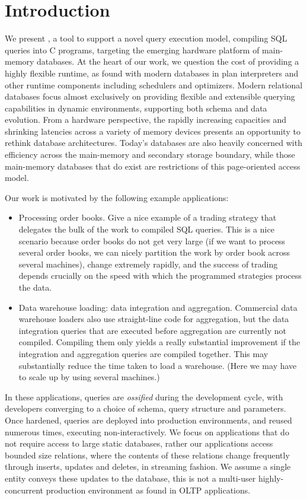\section{Introduction}
We present \compiler, a tool to support a novel query execution model, compiling
SQL queries into C programs, targeting the emerging hardware platform of main-memory
databases. At the heart of our work, we question the cost of providing a highly
flexible runtime, as found with modern databases in plan interpreters and other
runtime components including schedulers and optimizers. Modern relational
databases focus almost exclusively on providing flexible and extensible querying
capabilities in dynamic environments, supporting both schema and data evolution.
From a hardware perspective, the rapidly increasing capacities and shrinking
latencies across a variety of memory devices presents an opportunity to rethink
database architectures. Today's databases are also heavily concerned with
efficiency across the main-memory and secondary storage boundary, while those
main-memory databases that do exist are restrictions of this page-oriented access
model.

Our work is motivated by the following example applications:

\begin{itemize}
\item
Processing order books. Give a nice example of a trading strategy that
delegates the bulk of the work to compiled SQL queries.
This is a nice scenario because order books do not get very large (if we
want to process several order books, we can nicely partition the work by
order book across several machines), change extremely rapidly, and the
success of trading depends crucially on the speed with which the programmed
strategies process the data.

\item
Data warehouse loading: data integration and aggregation.
Commercial data warehouse loaders also use straight-line code for aggregation,
but the data integration queries that are executed before aggregation are
currently not compiled. Compiling them only yields a really substantial
improvement if the integration and aggregation queries are compiled together.
This may substantially reduce the time taken to load a warehouse. (Here we may
have to scale up by using several machines.)
\end{itemize}

In these applications, queries are \textit{ossified} during the development
cycle, with developers converging to a choice of schema, query structure and parameters.
Once hardened, queries are deployed into production environments, and reused
numerous times, executing non-interactively. We focus on applications that
do not require access to large static databases, rather our applications access bounded
size relations, where the contents of these relations change frequently through
inserts, updates and deletes, in streaming fashion. We assume a single entity
conveys these updates to the database, this is not a multi-user highly-concurrent
production environment as found in OLTP applications.
 
